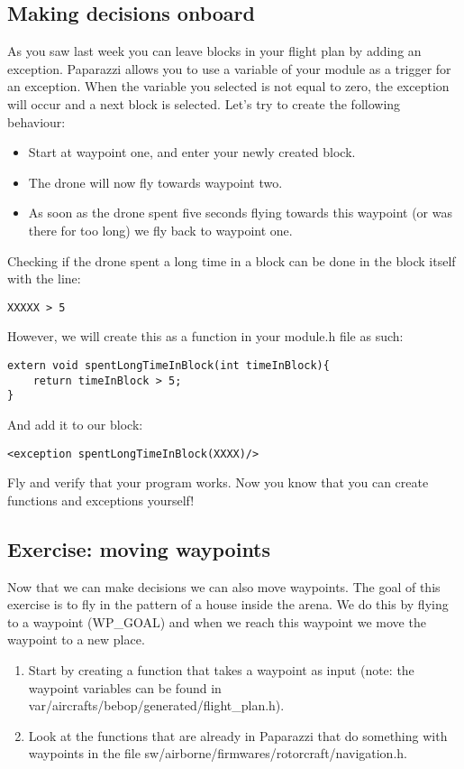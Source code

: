 \documentclass{article}
\begin{document}
\subsection*{Making decisions onboard}
As you saw last week you can leave blocks in your flight plan by adding an exception. Paparazzi allows you to use a variable of your module as a trigger for an exception. When the variable you selected is not equal to zero, the exception will occur and a next block is selected. 
Let's try to create the following behaviour: 
\begin{itemize}
\item Start at waypoint one, and enter your newly created block. 
\item The drone will now fly towards waypoint two. 
\item As soon as the drone spent five seconds flying towards this waypoint (or was there for too long) we fly back to waypoint one. 
\end{itemize}
Checking if the drone spent a long time in a block can be done in the block itself with the line:
\begin{verbatim}
XXXXX > 5
\end{verbatim}
However, we will create this as a function in your module.h file as such:
\begin{verbatim}
extern void spentLongTimeInBlock(int timeInBlock){
	return timeInBlock > 5;
}
\end{verbatim}
And add it to our block:
\begin{verbatim}
<exception spentLongTimeInBlock(XXXX)/>
\end{verbatim}
Fly and verify that your program works. Now you know that you can create functions and exceptions yourself!

\subsection*{Exercise: moving waypoints}
Now that we can make decisions we can also move waypoints. The goal of this exercise is to fly in the pattern of a house inside the arena. 
We do this by flying to a waypoint (WP\_GOAL) and when we reach this waypoint we move the waypoint to a new place. 

\begin{enumerate}
\item Start by creating a function that takes a waypoint as input (note: the waypoint variables can be found in var/aircrafts/bebop/generated/flight\_plan.h).
\item Look at the functions that are already in Paparazzi that do something with waypoints in the file sw/airborne/firmwares/rotorcraft/navigation.h. 
\end{enumerate}
\end{document}
